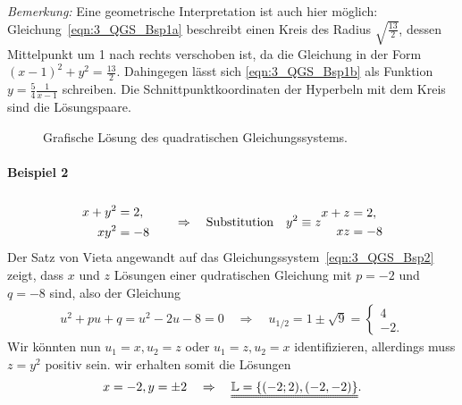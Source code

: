 \emph{Bemerkung:} Eine geometrische Interpretation ist auch hier möglich: Gleichung~\eqref{eqn:3_QGS_Bsp1a} beschreibt einen Kreis des Radius $\sqrt{\frac{13}{2}}$, dessen Mittelpunkt um 1 nach rechts verschoben ist, da die Gleichung in der Form $\textstyle (x-1)^2 + y^2 = \frac{13}{2}$. Dahingegen lässt sich \eqref{eqn:3_QGS_Bsp1b} als Funktion $y = \frac{5}{4}\frac{1}{x-1}$ schreiben. Die Schnittpunktkoordinaten der Hyperbeln mit dem Kreis sind die Lösungspaare. 
\begin{figure}[htp]
    \centering
    \caption{Grafische Lösung des quadratischen Gleichungssystems.}
\end{figure}

\paragraph{Beispiel 2}$~$
\begin{align}
    \begin{split}     
        x + y^2 &= 2, \\
        x y^2 &= -8 
    \end{split} 
    \qquad\Rightarrow\qq{Substitution} y^2 \equiv z 
    \begin{split}
        x+ z &= 2, \\
        xz &= -8
    \end{split}\label{eqn:3_QGS_Bsp2}
\end{align}
Der Satz von Vieta angewandt auf das Gleichungssystem~\eqref{eqn:3_QGS_Bsp2} zeigt, dass $x$ und $z$ Lösungen einer qudratischen Gleichung mit $p = -2$ und $q = -8$ sind, also der Gleichung 
\begin{align}
    u^2 + pu +q = u^2 -2u - 8 = 0 \quad \Rightarrow \quad u_{1/2} = 1 \pm \sqrt{9} = \begin{cases}
        4 \\ -2.
    \end{cases}
\end{align}
Wir könnten nun $u_1 = x, u_2 =z$ oder $u_1 = z, u_2 = x$ identifizieren, allerdings muss $z = y^2$ positiv sein. wir erhalten somit die Lösungen 
\begin{align}
    x= -2, y = \pm 2 \quad \Rightarrow \quad \uuline{\mathbb{L} = \{(-2;2),(-2,-2)\}}.
\end{align}